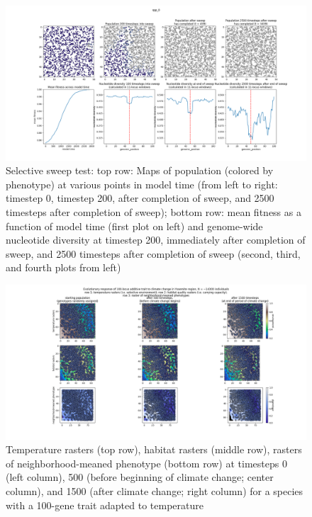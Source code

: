 ﻿\documentclass{article}
\begin{document}
\begin{figure}[h!]
\includegraphics[width=175mm]{./img/validation/sweep/sweep_results.png}
        \caption{Selective sweep test: top row: Maps of population (colored by phenotype) at various points in model time (from left to right: timestep 0, timestep 200, after completion of sweep, and 2500 timesteps after completion of sweep); bottom row: mean fitness as a function of model time (first plot on left) and genome-wide nucleotide diversity at timestep 200, immediately after completion of sweep, and 2500 timesteps after completion of sweep (second, third, and fourth plots from left)}
\end{figure}


\begin{figure}[h!]
\includegraphics[width=175mm]{./img/example/yosemite_results.png}
        \caption{Temperature rasters (top row), habitat rasters (middle row), rasters of neighborhood-meaned phenotype (bottom row) at timesteps 0 (left column), 500 (before beginning of climate change; center column), and 1500 (after climate change; right column) for a species with a 100-gene trait adapted to temperature}
\end{figure}
\end{document}
